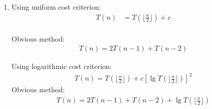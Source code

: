 \documentclass{article}
\newcommand\floor[1]{\lfloor#1\rfloor}
\begin{document}
\begin{enumerate} [label=(\alph*)]
If $n$ is an even number,  let $2k=n$  and $k=\frac{n}{2}$ , then 
\begin{align*} 
S(n) &= S(2k)  \\ 
	& = S(k)S(k) + S(k-1)S(k-1) \\
	& = S(\frac{n}{2})S(\frac{n}{2}) + S(\frac{n-2}{2}S(\frac{n-2}{2}) \\
S(n-1) &= S(2k-1)  \\ 
	&= 2S(k-1)S(k) - 2S(k-1)S(k-1) \\
	& = 2S(\frac{n-2}{2})S(\frac{n}{2}) - 2S(\frac{n-2}{2})S(\frac{n-2}{2}) \\
\end{align*}
Pseudocode:  \\
\begin{algorithm}[H]
Function $SoSoSplotchy (n)$: \\
	{return (2, 1)} 
{
{\begin{align*}
	&S(\frac{n-1}{2}), S(\frac{n-3}{2}) = SoSoplotchy (\frac{n-1}{2})  \\
	&S(n) = 2S(\frac{n-1}{2})S(\frac{n-1}{2}) + 2S(\frac{n-3}{2})S(\frac{n-1}{2})\\
	&S(n-1) = S(\frac{n-1}{2})S(\frac{n-1}{2}) + S(\frac{n-3}{2})S(\frac{n-3}{2}) \\
\end{align*} }
 {
 \begin{align*}
	&S(\frac{n}{2}), S(\frac{n-2}{2}) = SoSoplotchy (\frac{n}{2})  \\
	&S(n) = S(\frac{n}{2})S(\frac{n}{2}) + S(\frac{n-2}{2}S(\frac{n-2}{2}) \\
	&S(n-1) = 2S(\frac{n-2}{2})S(\frac{n}{2}) - 2S(\frac{n-2}{2})S(\frac{n-2}{2}) \\
\end{align*}    }
}
return $S(n), S(n-1)$ 

\end{algorithm}
\item 
Using uniform cost criterion:  \\
\begin{align*} 
T(n) & = T(\floor{\frac{n}{2}}) + c \\
\end{align*} 


Obvious method:  \\
\begin{align*}
T(n) = 2T(n-1) + T(n-2) 
\end{align*} 

Using logarithmic cost criterion:  \\
\begin{align*} 
T(n) = T(\floor{\frac{n}{2}}) + c \left[ \lg{T(\floor{\frac{n}{2}})} \right] ^2
\end{align*}
Obvious method:  \\
\begin{align*}
T(n) = 2T(n-1) + T(n-2) +  \lg{T(\floor{\frac{n}{2}})} 
\end{align*} 

\end{enumerate}
\end{document}
